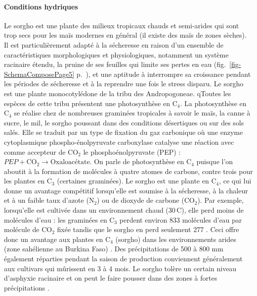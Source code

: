 \documentclass[a4paper,11pt]{article}
\begin{document}
\paragraph{Conditions hydriques} Le sorgho est une plante des milieux
tropicaux chauds et semi-arides qui sont trop secs pour les maïs
modernes en général (il existe des maïs de zones sèches). Il est
particulièrement adapté à la sécheresse en raison d'un ensemble de
caractéristiques morphologiques et physiologiques, notamment un
système racinaire étendu, la pruine de ses feuilles qui limite ses
pertes en eau (fig.~\ref{fig-SchemaComposePage5}
p.~\pageref{fig-SchemaComposePage5}), et une aptitude à interrompre sa
croissance pendant les périodes de sécheresse et à la reprendre une
fois le stress disparu. Le sorgho est une plante monocotylédone de la
tribu des Andropogoneae. qToutes les espèces de cette tribu présentent
une photosynthèse en $\text{C}_4$. La photosynthèse en $\text{C}_4$ se
réalise chez de nombreuses graminées tropicales à savoir le maïs, la
canne à sucre, le mil, le sorgho poussant dans des conditions
désertiques ou sur des sols salés. Elle se traduit par un type de
fixation du gaz carbonique où une enzyme cytoplasmique
phospho-énolpyruvate carboxylase catalyse une réaction avec comme
accepteur de $\text{CO}_2$ le phosphoénolpyruvate (PEP) :
$PEP + \text{CO}_2 \longrightarrow \text{Oxaloacétate}$. On parle de
photosynthèse en $\text{C}_4$ puisque l'on aboutit à la formation de
molécules à quatre atomes de carbone, contre trois pour les plantes en
$\text{C}_3$ (certaines graminées). Le sorgho est une plante en
$\text{C}_4$, ce qui lui donne un avantage compétitif lorsqu'elle est
soumise à la sécheresse, à la chaleur et à un faible taux d'azote
($\text{N}_2$) ou de dioxyde de carbone ($\text{CO}_2$). Par exemple,
lorsqu'elle est cultivée dans un environnement chaud (30\,\degree{}C),
elle perd moins de molécules d'eau : les graminées en $\text{C}_3$
perdent environ 833 molécules d'eau par molécule de $\text{CO}_2$
fixée tandis que le sorgho en perd seulement 277
\cite{sage1998c4}. Ceci offre donc un avantage aux plantes en
$\text{C}_4$ (sorgho) dans les environnements arides (zone sahélienne
au Burkina Faso) \cite{sage1998c4}. Des précipitations de 500 à 800 mm
également réparties pendant la saison de production conviennent
généralement aux cultivars qui mûrissent en 3 à 4 mois. Le sorgho
tolère un certain niveau d'asphyxie racinaire et on peut le faire
pousser dans des zones à fortes précipitations
\cite{BARRO_KONDOMBO_2010}.
\end{document}
